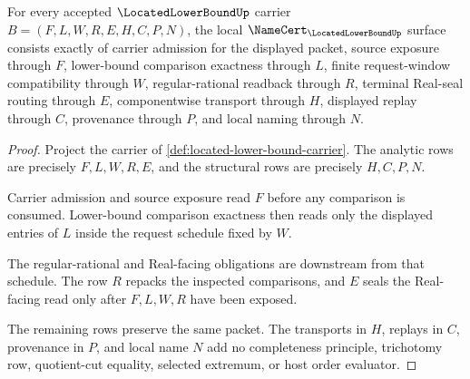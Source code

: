\begin{theorem}
\label{thm:located-lower-bound-namecert-obligations}
For every accepted $\LocatedLowerBoundUp$ carrier $B=(F,L,W,R,E,H,C,P,N)$, the local $\NameCert_{\LocatedLowerBoundUp}$ surface consists exactly of carrier admission for the displayed packet, source exposure through $F$, lower-bound comparison exactness through $L$, finite request-window compatibility through $W$, regular-rational readback through $R$, terminal Real-seal routing through $E$, componentwise transport through $H$, displayed replay through $C$, provenance through $P$, and local naming through $N$.
\end{theorem}
\begin{proof}
Project the carrier of \autoref{def:located-lower-bound-carrier}. The analytic rows are precisely $F,L,W,R,E$, and the structural rows are precisely $H,C,P,N$.

Carrier admission and source exposure read $F$ before any comparison is consumed. Lower-bound comparison exactness then reads only the displayed entries of $L$ inside the request schedule fixed by $W$.

The regular-rational and Real-facing obligations are downstream from that schedule. The row $R$ repacks the inspected comparisons, and $E$ seals the Real-facing read only after $F,L,W,R$ have been exposed.

The remaining rows preserve the same packet. The transports in $H$, replays in $C$, provenance in $P$, and local name $N$ add no completeness principle, trichotomy row, quotient-cut equality, selected extremum, or host order evaluator.
\end{proof}

